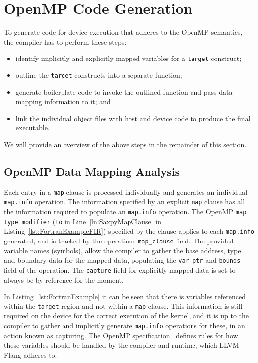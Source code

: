 \documentclass[acmtog,natbib=false]{acmart}
\newcommand{\code}[1]{\texttt{#1}\xspace}
\begin{document}
\section{OpenMP Code Generation}
\label{sec:OpenMPCodeGen}

To generate code for device execution that adheres to the OpenMP semantics, the compiler has to perform these steps:

\begin{itemize}
\item identify implicitly and explicitly mapped variables for a \code{target} construct;
\item outline the \code{target} constructs into a separate function;
\item generate boilerplate code to invoke the outlined function and pass data-mapping information to it; and
\item link the individual object files with host and device code to produce the final executable.
\end{itemize}

We will provide an overview of the above steps in the remainder of this section.

\subsection{OpenMP Data Mapping Analysis}
\label{sec:OpenMPDataMappingAnalysis}

Each entry in a \code{map} clause is processed individually and generates an individual \code{map.info} operation. 
The information specified by an explicit \code{map} clause has all the information required to populate an \code{map.info} operation. 
The OpenMP \code{map type modifier} (\code{to} in Line~\ref{ln:SaxpyMapClause} in Listing~\ref{lst:FortranExampleFIR}) specified by the clause applies to each \code{map.info} generated, and is tracked by the operations \code{map\_clause} field. 
The provided variable names (symbols), allow the compiler to gather the base address, type and boundary data for the mapped data, populating the \code{var\_ptr} and \code{bounds} field of the operation. 
The \code{capture} field for explicitly mapped data is set to always be by reference for the moment.

In Listing~\ref{lst:FortranExample} it can be seen that there is variables referenced within the \code{target} region and not within a \code{map} clause. 
This information is still required on the device for the correct execution of the kernel, and it is up to the compiler to gather and implicitly generate \code{map.info} operations for these, in an action known as capturing. 
The OpenMP specification~\cite{OARB24} defines rules for how these variables should be handled by the compiler and runtime, which LLVM Flang adheres to. 
\end{document}
